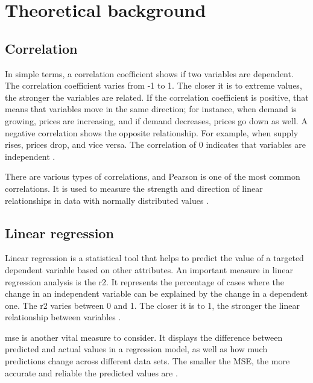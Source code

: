 \chapter{Theoretical background}
\section{Correlation}

In simple terms, a correlation coefficient shows if two variables are dependent. The correlation coefficient varies from -1 to 1. The closer it is to extreme values, the stronger the variables are related. If the correlation coefficient is positive, that means that variables move in the same direction; for instance, when demand is growing, prices are increasing, and if demand decreases, prices go down as well. A negative correlation shows the opposite relationship. For example, when supply rises, prices drop, and vice versa. The correlation of 0 indicates that variables are independent \autocite{DaCostaLewis2005}.
\par
There are various types of correlations, and Pearson is one of the most common correlations. It is used to measure the strength and direction of linear relationships in data with normally distributed values
\autocite{schoberCorrelationCoefficientsAppropriate2018}.

\section{Linear regression}

Linear regression is a statistical tool that helps to predict the value of a targeted dependent variable based on other attributes. An important measure in linear regression analysis is the \ac{r2}. It represents the percentage of cases where the change in an independent variable can be explained by the change in a dependent one. The \ac{r2} varies between 0 and 1. The closer it is to 1, the stronger the linear relationship between variables
\autocite{kumariLinearRegressionAnalysis2018}.
\par
\ac{mse} is another vital measure to consider. It displays the difference between predicted and actual values in a regression model, as well as how much predictions change across different data sets. The smaller the MSE, the more accurate and reliable the predicted values are
\autocite{Schluchter2005}.
